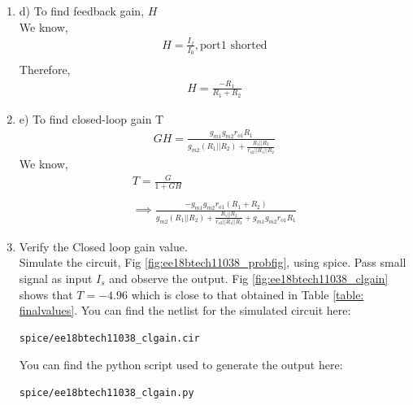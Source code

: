 \begin{enumerate}[label=\arabic*.,ref=\theenumi]
\item d) To find feedback gain, $H$\\
\solution We know,
\begin{align}
    H = \frac{I_{f}}{I_{0}}, \text{port1 shorted}\\
\end{align}
Therefore,
\begin{align}
    H = \frac{-R_{1}}{R_{1} + R_{2}}
\end{align}

\item e) To find closed-loop gain T\\
\solution 
\begin{align}
    GH = \frac{g_{m1}g_{m2}r_{o1}R_{1}}{g_{m2}(R_{1}||R_{2}) + \frac{R_{1}||R_{2}}{r_{o2}||R_{1}||R_{2}}}
\end{align}
We know, 
\begin{align}
    T = \frac{G}{1+GH}\\ \\
    \implies \frac{-g_{m1}g_{m2}r_{o1}(R_{1} + R_{2})}{g_{m2}(R_{1}||R_{2}) + \frac{R_{1}||R_{2}}{r_{o2}||R_{1}||R_{2}} +g_{m1}g_{m2}r_{o1}R_{1}}
\end{align}

\item Verify the Closed loop gain value.\\
\solution Simulate the circuit, Fig \ref{fig:ee18btech11038_probfig}, using spice. Pass small signal as input $I_{s}$ and observe the output. Fig \ref{fig:ee18btech11038_clgain} shows that $T=-4.96$ which is close to that obtained in Table \ref{table: finalvalues}.
You can find the netlist for the simulated circuit here:
\begin{lstlisting}
spice/ee18btech11038_clgain.cir
\end{lstlisting}
You can find the python script used to generate the output here:
\begin{lstlisting}
spice/ee18btech11038_clgain.py
\end{lstlisting}


\end{enumerate}
